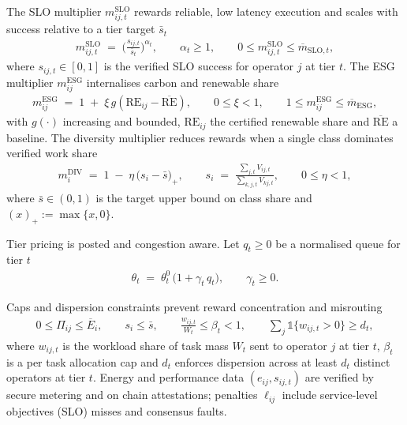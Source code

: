\documentclass[oneside,10pt]{swissi}
\begin{document}
The SLO multiplier \(m^{\mathrm{SLO}}_{ij,t}\) rewards reliable, low latency execution and scales with success relative to a tier target \(\bar s_t\)
\begin{align}
m^{\mathrm{SLO}}_{ij,t} \;=\; \Big(\tfrac{s_{ij,t}}{\bar s_t}\Big)^{\alpha_t},
\qquad \alpha_t \ge 1,
\qquad 0 \le m^{\mathrm{SLO}}_{ij,t} \le \overline{m}_{\mathrm{SLO},t},
\label{eq:slo-mult}
\end{align}
where \(s_{ij,t}\in[0,1]\) is the verified SLO success for operator \(j\) at tier \(t\). The ESG multiplier \(m^{\mathrm{ESG}}_{ij}\) internalises carbon and renewable share
\begin{align}
m^{\mathrm{ESG}}_{ij} \;=\; 1 \;+\; \xi\, g(\mathrm{RE}_{ij} - \overline{\mathrm{RE}}),
\qquad 0 \le \xi < 1,
\qquad 1 \le m^{\mathrm{ESG}}_{ij} \le \overline{m}_{\mathrm{ESG}},
\label{eq:esg-mult}
\end{align}
with \(g(\cdot)\) increasing and bounded, \(\mathrm{RE}_{ij}\) the certified renewable share and \(\overline{\mathrm{RE}}\) a baseline. The diversity multiplier reduces rewards when a single class dominates verified work share
\begin{align}
m^{\mathrm{DIV}}_{i} \;=\; 1 \;-\; \eta\, \big(s_i - \bar s\big)_+,
\qquad s_i \;=\; \frac{\sum_{j,t} V_{ij,t}}{\sum_{k,j,t} V_{kj,t}},
\qquad 0 \le \eta < 1,
\label{eq:div-mult}
\end{align}
where \(\bar s\in(0,1)\) is the target upper bound on class share and \((x)_+ := \max\{x,0\}\).

Tier pricing is posted and congestion aware. Let \(q_t\ge 0\) be a normalised queue for tier \(t\)
\begin{align}
\theta_t \;=\; \theta_t^{0}\,\big(1 + \gamma_t\, q_t\big),
\qquad \gamma_t \ge 0.
\label{eq:congestion}
\end{align}

Caps and dispersion constraints prevent reward concentration and misrouting
\begin{align}
0 \le \Pi_{ij} \le \overline{E}_{i},
\qquad
s_i \le \bar s,
\qquad
\frac{w_{ij,t}}{W_t} \le \beta_t < 1,
\qquad
\sum_{j} \mathbb{1}\{w_{ij,t}>0\} \ge d_t,
\label{eq:caps-dispersion}
\end{align}
where \(w_{ij,t}\) is the workload share of task mass \(W_t\) sent to operator \(j\) at tier \(t\), \(\beta_t\) is a per task allocation cap and \(d_t\) enforces dispersion across at least \(d_t\) distinct operators at tier \(t\). Energy and performance data \((e_{ij}, s_{ij,t})\) are verified by secure metering and on chain attestations; penalties \(\ell_{ij}\) include service-level objectives (SLO) misses and consensus faults.
\end{document}
